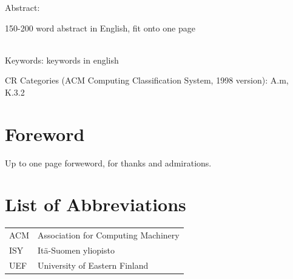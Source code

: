 \begin{spacing}{1.0}
Abstract:

150-200 word abstract in English, fit onto one page




~\\ %
Keywords:
keywords in english




CR Categories (ACM Computing Classification System,
1998 version): A.m, K.3.2\\

\end{spacing}

\newpage



\section*{Foreword}
Up to one page forweword, for thanks and admirations.

\newpage


\section*{List of Abbreviations}

\begin{tabular}{lp{12.5cm}}

ACM & Association for Computing Machinery \\

ISY & Itä-Suomen yliopisto \\

UEF & University of Eastern Finland\\

\end{tabular}

\newpage




\setlength{\parskip}{0ex}

\tableofcontents
\newpage

\setlength{\parskip}{2ex}
